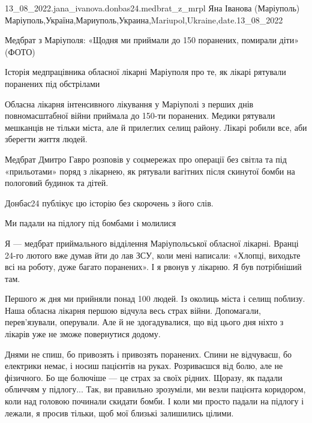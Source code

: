  
 
 
 
 

13_08_2022.jana_ivanova.donbas24.medbrat_z_mrpl
Яна Іванова (Маріуполь)
Маріуполь,Україна,Мариуполь,Украина,Mariupol,Ukraine,date.13_08_2022

Медбрат з Маріуполя: «Щодня ми приймали до 150 поранених, помирали діти» (ФОТО)

Історія медпрацівника обласної лікарні Маріуполя про те, як лікарі рятували поранених під обстрілами

Обласна лікарня інтенсивного лікування у Маріуполі з перших днів
повномасштабної війни приймала до 150-ти поранених. Медики рятували мешканців
не тільки міста, але й прилеглих селищ району. Лікарі робили все, аби зберегти
життя людей.

Медбрат Дмитро Гавро розповів у соцмережах про операції без світла та під
«прильотами» поряд з лікарнею, як рятували вагітних після скинутої бомби на
пологовий будинок та дітей.

Донбас24 публікує цю історію без скорочень з його слів.

Ми падали на підлогу під бомбами і молилися

Я — медбрат приймального відділення Маріупольської обласної лікарні. Вранці 24-го лютого вже думав йти до лав ЗСУ, коли мені написали: «Хлопці, виходьте всі на роботу, дуже багато поранених». І я рвонув у лікарню. Я був потрібніший там.

Першого ж дня ми прийняли понад 100 людей. Із околиць міста і селищ поблизу. Наша обласна лікарня першою відчула весь страх війни. Допомагали, перев'язували, оперували. Але й не здогадувалися, що від цього дня ніхто з лікарів уже не зможе повернутися додому.

Днями не спиш, бо привозять і привозять поранених. Спини не відчуваєш, бо електрики немає, і носиш пацієнтів на руках. Розриваєшся від болю, але не фізичного. Бо ще болючіше — це страх за своїх рідних. Щоразу, як падали обличчям у підлогу... Так, ви правильно зрозуміли, ми везли пацієнта коридором, коли над головою починали скидати бомби. І коли ми просто падали на підлогу і лежали, я просив тільки, щоб мої близькі залишились цілими.

